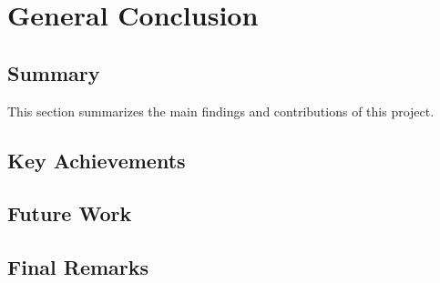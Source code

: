 \chapter*{General Conclusion}

\section*{Summary}

This section summarizes the main findings and contributions of this project.

\section*{Key Achievements}


\section*{Future Work}


\section*{Final Remarks}

